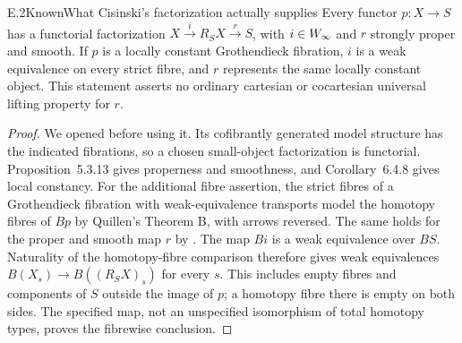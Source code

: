 \begin{statement}{E.2}{Known}{What Cisinski's factorization actually supplies}
Every functor $p:X\to S$ has a functorial factorization $X\xrightarrow{i}R_SX\xrightarrow{r}S$, with $i\in W_{\infty}$ and $r$ strongly proper and smooth. If $p$ is a locally constant Grothendieck fibration, $i$ is a weak equivalence on every strict fibre, and $r$ represents the same locally constant object. This statement asserts no ordinary cartesian or cocartesian universal lifting property for $r$.
\end{statement}
\begin{proof}
We opened \citet[Theorem~5.3.14, pp.~230--231]{E_Cisinski2006} before using it. Its cofibrantly generated model structure has the indicated fibrations, so a chosen small-object factorization is functorial. Proposition~5.3.13 gives properness and smoothness, and Corollary~6.4.8 gives local constancy. For the additional fibre assertion, the strict fibres of a Grothendieck fibration with weak-equivalence transports model the homotopy fibres of $Bp$ by Quillen's Theorem B, with arrows reversed. The same holds for the proper and smooth map $r$ by \citet[Corollaries~6.4.8 and 6.4.16]{E_Cisinski2006}. The map $Bi$ is a weak equivalence over $BS$. Naturality of the homotopy-fibre comparison therefore gives weak equivalences $B(X_s)\to B((R_SX)_s)$ for every $s$. This includes empty fibres and components of $S$ outside the image of $p$; a homotopy fibre there is empty on both sides. The specified map, not an unspecified isomorphism of total homotopy types, proves the fibrewise conclusion.
\end{proof}

